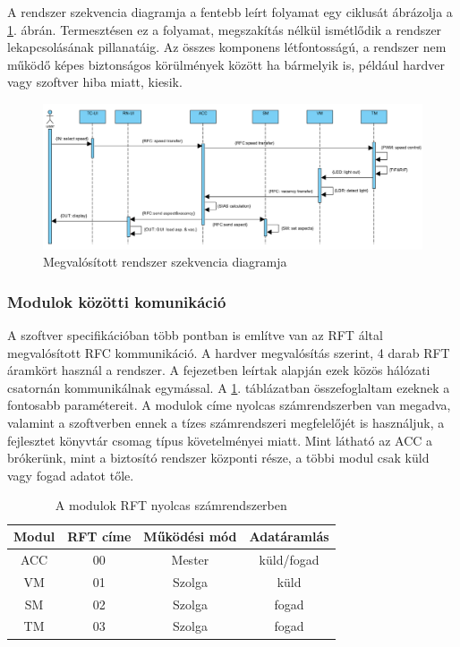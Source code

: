 \documentclass[a4paper,12pt]{article}
\begin{document}
A rendszer szekvencia diagramja a fentebb leírt folyamat egy ciklusát ábrázolja a \ref{fig:ra_sequence_diagram}. ábrán. 
Termesztésen ez a folyamat, megszakítás nélkül ismétlődik a rendszer lekapcsolásának pillanatáig.
Az összes komponens létfontosságú, a rendszer nem működő képes biztonságos körülmények között ha bármelyik is, például hardver vagy szoftver hiba miatt, kiesik.

\begin{figure}[htp]
    \centering
	\includegraphics[width=\textwidth]{images/ra_sequence_diagram.png}
    \caption[Rendszer szekvencia diagram]{Megvalósított rendszer szekvencia diagramja}
	\label{fig:ra_sequence_diagram}
\end{figure}

\subsubsection{Modulok közötti komunikáció}
A szoftver specifikációban több pontban is említve van az RFT által megvalósított RFC kommunikáció.
A hardver megvalósítás szerint, 4 darab RFT áramkört használ a rendszer.
A \textit{} fejezetben leírtak alapján ezek közös hálózati csatornán kommunikálnak egymással.
A \ref{tab:rftadress}. táblázatban összefoglaltam ezeknek a fontosabb paramétereit.
A modulok címe nyolcas számrendszerben van megadva, valamint a szoftverben ennek a tízes számrendszeri megfelelőjét is használjuk, a fejlesztet könyvtár csomag típus követelményei miatt.
Mint látható az ACC a brókerünk, mint a biztosító rendszer központi része, a többi modul csak küld vagy fogad adatot tőle.

\begin{table}[htp]
    \centering
    \begin{tabular}{|c|c|c|c|}\hline
        Modul  & RFT címe & Működési mód & Adatáramlás \\ \hline
        ACC  & 00 & Mester & küld/fogad \\ \hline
        VM & 01 & Szolga  & küld \\ \hline
        SM & 02 & Szolga & fogad \\ \hline
        TM & 03 & Szolga & fogad \\\hline
    \end{tabular}
    \caption[RFT cimek]{A modulok RFT nyolcas számrendszerben}
    \label{tab:rftadress}
\end{table}
\end{document}

